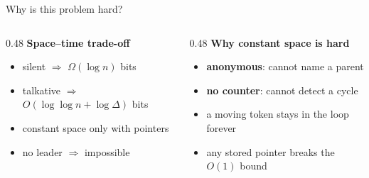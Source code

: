 \documentclass[aspectratio=169,11pt]{beamer}
\newcommand{\bodyfont}{\footnotesize}
\begin{document}
\begin{frame}{Why is this problem hard?}
\bodyfont
\begin{columns}[T]
\begin{column}{0.48\textwidth}
\textbf{Space--time trade-off}
\begin{itemize}\setlength\itemsep{5pt}
\item silent $\Rightarrow$ $\Omega(\log n)$ bits
\item talkative $\Rightarrow$ $O(\log\log n+\log\Delta)$ bits
\item constant space only with pointers
\item no leader $\Rightarrow$ impossible
\end{itemize}
\end{column}
\begin{column}{0.48\textwidth}
\textbf{Why constant space is hard}
\begin{itemize}\setlength\itemsep{5pt}
\item \textbf{anonymous}: cannot name a parent
\item \textbf{no counter}: cannot detect a cycle
\item a moving token stays in the loop forever
\item any stored pointer breaks the $O(1)$ bound
\end{itemize}
\end{column}
\end{columns}

\vfill
\begin{center}
\end{center}
\vspace{1mm}
\end{frame}
\end{document}
